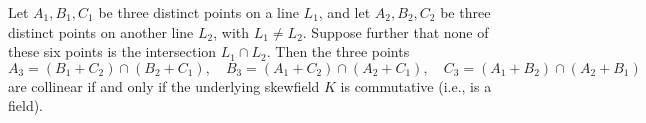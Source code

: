 Let $A_1, B_1, C_1$ be three distinct points on a line $L_1$, and let $A_2, B_2, C_2$ be three distinct points on another line $L_2$, with $L_1 \neq L_2$. Suppose further that none of these six points is the intersection $L_1 \cap L_2$. Then the three points
$$A_3 = (B_1 + C_2) \cap (B_2 + C_1), \quad B_3 = (A_1 + C_2) \cap (A_2 + C_1), \quad C_3 = (A_1 + B_2) \cap (A_2 + B_1)$$
are collinear if and only if the underlying skewfield $K$ is commutative (i.e., is a field).
